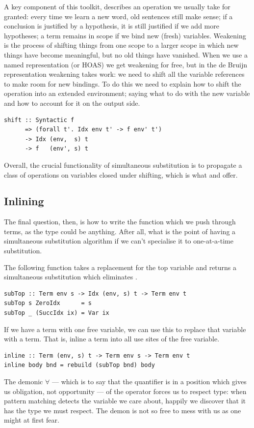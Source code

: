 A key component of this toolkit,  describes an operation we
usually take for granted: every time we learn a new word, old sentences still
make sense; if a conclusion is justified by a hypothesis, it is still justified
if we add more hypotheses; a term remains in scope if we bind new (fresh)
variables. Weakening is the process of shifting things from one scope to a
larger scope in which new things have become meaningful, but no old things have
vanished. When we use a named representation (or HOAS) we get weakening
for free, but in the de Bruijn representation weakening takes
work: we need to shift all the variable references to make room for new
bindings. To do this we need to explain how to shift the  operation into
an extended environment; saying what to do with the new variable and how to
account for it on the output side.
%
\begin{lstlisting}[style=haskell]
shift :: Syntactic f
      => (forall t'. Idx env t' -> f env' t')
      -> Idx (env,  s) t
      -> f   (env', s) t
\end{lstlisting}
%
Overall, the crucial functionality of simultaneous substitution is to propagate
a class of operations on variables closed under shifting, which is what
 and  offer.


\subsection{Inlining}
\label{sec:inlining}

The final question, then, is how to write the function  which we push
through terms, as the type  could be anything. After all, what
is the point of having a simultaneous substitution algorithm if we can't
specialise it to one-at-a-time substitution.

The following function takes a replacement for the top variable and returns a
simultaneous substitution which eliminates .
%
\begin{lstlisting}[style=haskell]
subTop :: Term env s -> Idx (env, s) t -> Term env t
subTop s ZeroIdx      = s
subTop _ (SuccIdx ix) = Var ix
\end{lstlisting}
%
If we have a term with one free variable, we can use this to replace that
variable with a term. That is, inline a term into all use sites of the free
variable.
%
\begin{lstlisting}[style=haskell,firstnumber=last,caption={A simultaneous substitution to inline terms}]
inline :: Term (env, s) t -> Term env s -> Term env t
inline body bnd = rebuild (subTop bnd) body
\end{lstlisting}
%
The demonic $\forall$ --- which is to say that the quantifier is in a position
which gives us obligation, not opportunity --- of the operator  forces
us to respect type: when pattern matching detects the variable we care about,
happily we discover that it has the type we must respect. The demon is not so
free to mess with us as one might at first fear.

